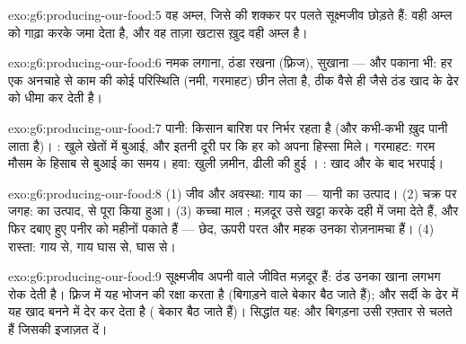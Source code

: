 \begin{solution}{exo:g6:producing-our-food:5}
वह अम्ल, जिसे  की शक्कर पर पलते सूक्ष्मजीव छोड़ते हैं: वही अम्ल 
को गाढ़ा करके जमा देता है, और वह ताज़ा खटास ख़ुद वही अम्ल है।
\end{solution}

\begin{solution}{exo:g6:producing-our-food:6}
नमक लगाना, ठंडा रखना (फ़्रिज), सुखाना --- और पकाना भी: हर एक अनचाहे
 से काम की कोई परिस्थिति (नमी, गरमाहट) छीन लेता है, ठीक
वैसे ही जैसे ठंड खाद के ढेर को धीमा कर देती है।
\end{solution}

\begin{solution}{exo:g6:producing-our-food:7}
पानी: किसान बारिश पर निर्भर रहता है (और कभी-कभी ख़ुद पानी लाता है)।
: खुले खेतों में बुआई, और इतनी दूरी पर कि हर  को अपना हिस्सा
मिले। गरमाहट: गरम मौसम के हिसाब से बुआई का समय। हवा: खुली ज़मीन, ढीली
की हुई । : खाद और  के बाद भरपाई।
\end{solution}

\begin{solution}{exo:g6:producing-our-food:8}
(1) जीव और अवस्था: गाय का  --- यानी  का उत्पाद। (2) चक्र
पर जगह:  का उत्पाद,  से पूरा किया हुआ। (3) कच्चा
माल ; मज़दूर उसे खट्टा करके दही में जमा देते हैं, और फिर दबाए हुए
पनीर को महीनों पकाते हैं --- छेद, ऊपरी परत और महक उनका रोज़नामचा हैं।
(4) रास्ता:  गाय से, गाय घास से, घास  से।
\end{solution}

\begin{solution}{exo:g6:producing-our-food:9}
सूक्ष्मजीव अपनी  वाले जीवित मज़दूर हैं: ठंड उनका खाना लगभग
रोक देती है। फ़्रिज में यह भोजन की रक्षा करता है (बिगाड़ने वाले बेकार
बैठ जाते हैं); और सर्दी के ढेर में यह खाद बनने में देर कर देता है
( बेकार बैठ जाते हैं)। सिद्धांत यह:  और बिगड़ना उसी रफ़्तार
से चलते हैं जिसकी  इजाज़त दें।
\end{solution}

